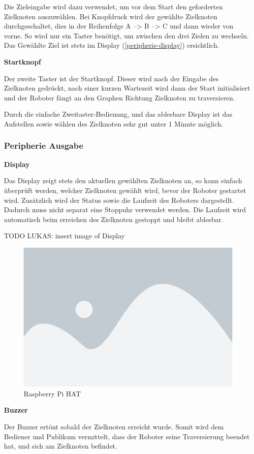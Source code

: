 Die Zieleingabe wird dazu verwendet, um vor dem Start den geforderten Zielknoten auszuwählen. Bei Knopfdruck wird der gewählte Zielknoten durchgeschaltet, dies in der Reihenfolge A --> B --> C und dann wieder von vorne. So wird nur ein Taster benötigt, um zwischen den drei Zielen zu wechseln. Das Gewählte Ziel ist stets im Display (\ref{peripherie-display}) ersichtlich.

\textbf{Startknopf}

Der zweite Taster ist der Startknopf. Dieser wird nach der Eingabe des Zielknoten gedrückt, nach einer kurzen Wartezeit wird dann der Start initialisiert und der Roboter fängt an den Graphen Richtung Zielknoten zu traversieren.

Durch die einfache Zweitaster-Bedienung, und das ablesbare Display ist das Aufstellen sowie wählen des Zielknoten sehr gut unter 1 Minute möglich. 

\subsubsection{Peripherie Ausgabe}

\textbf{Display}\label{peripherie-display}

Das Display zeigt stets den aktuellen gewählten Zielknoten an, so kann einfach überprüft werden, welcher Zielknoten gewählt wird, bevor der Roboter gestartet wird. 
Zusätzlich wird der Status sowie die Laufzeit des Roboters dargestellt. Dadurch muss nicht separat eine Stoppuhr verwendet werden. Die Laufzeit wird automatisch beim erreichen des Zielknoten gestoppt und bleibt ablesbar.

TODO LUKAS: insert image of Display
\begin{figure}[H]
    \centering
    \includegraphics[width=0.5\linewidth]{assets/placeholder.png}
    \caption{Raspberry Pi HAT}
    \label{fig:raspiheader-display}
\end{figure}


\textbf{Buzzer}\label{peripherie-buzzer}

Der Buzzer ertönt sobald der Zielknoten erreicht wurde. Somit wird dem Bediener und Publikum vermittelt, dass der Roboter seine Traversierung beendet hat, und sich am Zielknoten befindet.
